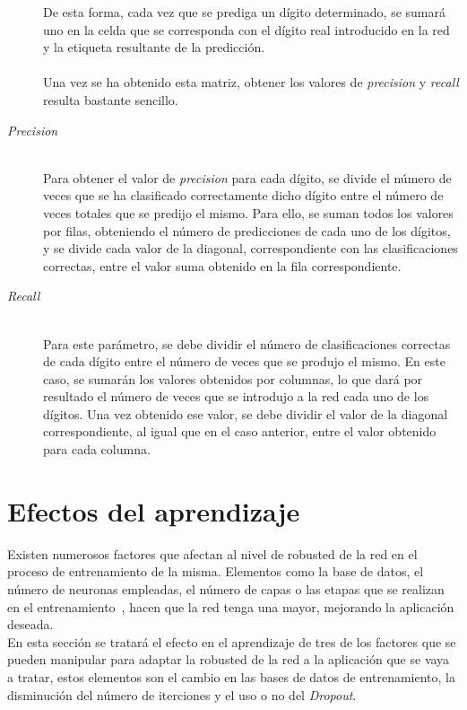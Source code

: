 \begin{description}
	De esta forma, cada vez que se prediga un dígito determinado, se sumará uno en la celda que se corresponda con el dígito real introducido en la red y la etiqueta resultante de la predicción.\\
	\vspace{-10pt}
	\\
	Una vez se ha obtenido esta matriz, obtener los valores de \textit{precision} y \textit{recall} resulta bastante sencillo.
	\vspace{15pt}
	\item[\textit{Precision}] \hfill 
	\vspace{10pt}
	\\
	Para obtener el valor de \textit{precision} para cada dígito, se divide el número de veces que se ha clasificado correctamente dicho dígito entre el número de veces totales que se predijo el mismo. Para ello, se suman todos los valores por filas, obteniendo el número de predicciones de cada uno de los dígitos, y se divide cada valor de la diagonal, correspondiente con las clasificaciones correctas, entre el valor suma obtenido en la fila correspondiente.
	\vspace{15pt}
	\item[\textit{Recall}] \hfill 
	\vspace{10pt}
	\\
	Para este parámetro, se debe dividir el número de clasificaciones correctas de cada dígito entre el número de veces que se produjo el mismo. En este caso, se sumarán los valores obtenidos por columnas, lo que dará por resultado el número de veces que se introdujo a la red cada uno de los dígitos. Una vez obtenido ese valor, se debe dividir el valor de la diagonal correspondiente, al igual que en el caso anterior, entre el valor obtenido para cada columna.
\end{description}

\section{Efectos del aprendizaje}
Existen numerosos factores que afectan al nivel de robusted de la red en el proceso de entrenamiento de la misma. Elementos como la base de datos, el número de neuronas empleadas, el número de capas o las etapas que se realizan en el entrenamiento~\cite{lopez2008redes}, hacen que la red tenga una mayor, mejorando la aplicación deseada.\\

En esta sección se tratará el efecto en el aprendizaje de tres de los factores que se pueden manipular para adaptar la robusted de la red a la aplicación que se vaya a tratar, estos elementos son el cambio en las bases de datos de entrenamiento, la disminución del número de iterciones y el uso o no del \textit{Dropout}.

